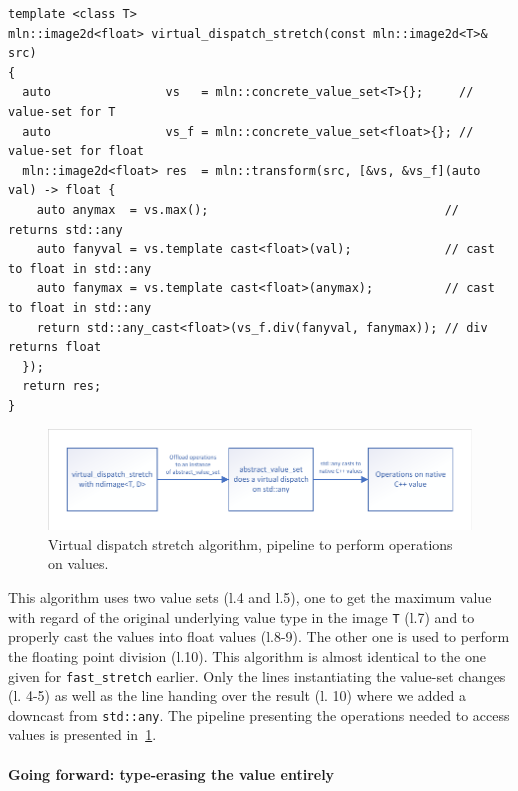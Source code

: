 \begin{verbatim}
template <class T>
mln::image2d<float> virtual_dispatch_stretch(const mln::image2d<T>& src)
{
  auto                vs   = mln::concrete_value_set<T>{};     // value-set for T
  auto                vs_f = mln::concrete_value_set<float>{}; // value-set for float
  mln::image2d<float> res  = mln::transform(src, [&vs, &vs_f](auto val) -> float {
    auto anymax  = vs.max();                                 // returns std::any
    auto fanyval = vs.template cast<float>(val);             // cast to float in std::any
    auto fanymax = vs.template cast<float>(anymax);          // cast to float in std::any
    return std::any_cast<float>(vs_f.div(fanyval, fanymax)); // div returns float
  });
  return res;
}
\end{verbatim}

\begin{figure}[htbp]
  \centering
  \includegraphics[width=.8\linewidth]{figs/static_dynamic_bridge/virtual_dispatch_stretch}
  \caption{Virtual dispatch stretch algorithm, pipeline to perform operations on values.}
  \label{fig:static_dyn.virtual_dispatch_stretch}
\end{figure}

This algorithm uses two value sets (l.4 and l.5), one to get the maximum value with regard of the original underlying
value type in the image \texttt{T} (l.7) and to properly cast the values into float values (l.8-9). The other one is
used to perform the floating point division (l.10). This algorithm is almost identical to the one given for
\texttt{fast\_stretch} earlier. Only the lines instantiating the value-set changes (l. 4-5) as well as the line handing
over the result (l. 10) where we added a downcast from \texttt{std::any}. The pipeline presenting the operations needed
to access values is presented in~\cref{fig:static_dyn.virtual_dispatch_stretch}.


\paragraph{Going forward: type-erasing the value entirely}

